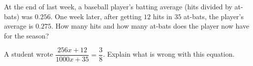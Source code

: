 At the end of last week, a baseball player's batting average (hits divided by at-bats) was $0.256$. One week later, after getting $12$ hits in $35$ at-bats, the player's average is $0.275$. How many hits and how many at-bats does the player now have for the season?

A student wrote $\dfrac{256x+12}{1000x+35}=\dfrac{3}{8}$. Explain what is wrong with this equation.

